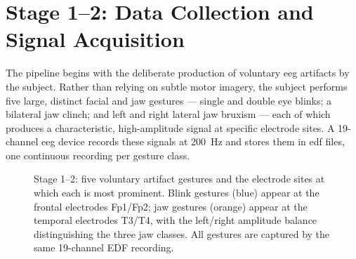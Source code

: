 \section{Stage 1--2: Data Collection and Signal Acquisition}
\label{sec:mo_collection}

The pipeline begins with the deliberate production of voluntary
\acrshort{eeg} artifacts by the subject. Rather than relying on
subtle motor imagery, the subject performs five large, distinct
facial and jaw gestures --- single and double eye blinks; a
bilateral jaw clinch; and left and right lateral jaw bruxism ---
each of which produces a characteristic, high-amplitude signal at
specific electrode sites. A 19-channel \acrshort{eeg} device records
these signals at \SI{200}{\hertz} and stores them in
\acrshort{edf} files, one continuous recording per gesture class.

\begin{figure}[htbp]
\centering
{}
\caption{Stage 1--2: five voluntary artifact gestures and the
electrode sites at which each is most prominent. Blink gestures
(blue) appear at the frontal electrodes Fp1/Fp2; jaw gestures
(orange) appear at the temporal electrodes T3/T4, with the
left/right amplitude balance distinguishing the three jaw classes.
All gestures are captured by the same 19-channel EDF recording.}
\label{fig:mo_collection}
\end{figure}


